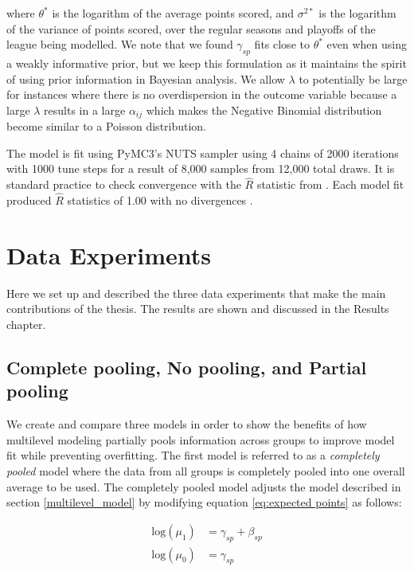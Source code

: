 where \(\theta^*\) is the logarithm of the average points scored, and \(\sigma^{2*}\) is the logarithm of the variance of points scored, over the regular seasons and playoffs of the league being modelled. We note that we found \(\gamma_{sp}\) fits close to \(\theta^*\) even when using a weakly informative prior, but we keep this formulation as it maintains the spirit of using prior information in Bayesian analysis. We allow \(\lambda\) to potentially be large for instances where there is no overdispersion in the outcome variable because a large \(\lambda\) results in a large \(\alpha_{ij}\) which makes the Negative Binomial distribution become similar to a Poisson distribution.

The model is fit using PyMC3's NUTS sampler using 4 chains of 2000 iterations with 1000 tune steps for a result of 8,000 samples from 12,000 total draws. It is standard practice to check convergence with the \(\hat{R}\) statistic from \cite{Gelman1992} \cite{Brooks1997}.  Each model fit produced \(\hat{R}\) statistics of 1.00 with no divergences \cite{Betancourt2017}.

\section{Data Experiments}

Here we set up and described the three data experiments that make the main contributions of the thesis. The results are shown and discussed in the Results chapter.

\subsection{Complete pooling, No pooling, and Partial pooling}
We create and compare three models in order to show the benefits of how multilevel modeling partially pools information across groups to improve model fit while preventing overfitting. The first model is referred to as a \textit{completely pooled} model where the data from all groups is completely pooled into one overall average to be used. The completely pooled model adjusts the model described in section \ref{multilevel_model} by modifying equation \ref{eq:expected points} as follows:

\begin{equation} \label{eq:cp_model}
\begin{split}
\text{log}(\mu_{1}) &= \gamma_{sp} + \beta_{sp} \\
\text{log}(\mu_{0}) &= \gamma_{sp}
\end{split}
\end{equation}

